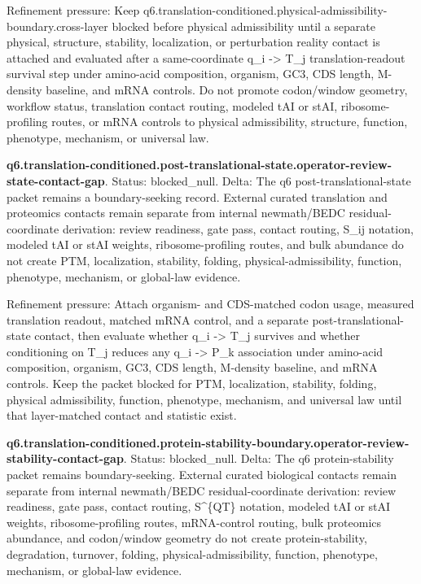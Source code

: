Refinement pressure: Keep q6.translation-conditioned.physical-admissibility-boundary.cross-layer blocked before physical admissibility until a separate physical, structure, stability, localization, or perturbation reality contact is attached and evaluated after a same-coordinate q\_i -> T\_j translation-readout survival step under amino-acid composition, organism, GC3, CDS length, M-density baseline, and mRNA controls. Do not promote codon/window geometry, workflow status, translation contact routing, modeled tAI or stAI, ribosome-profiling routes, or mRNA controls to physical admissibility, structure, function, phenotype, mechanism, or universal law.

\textbf{q6.translation-conditioned.post-translational-state.operator-review-state-contact-gap}. Status: blocked\_null. Delta: The q6 post-translational-state packet remains a boundary-seeking record. External curated translation and proteomics contacts remain separate from internal newmath/BEDC residual-coordinate derivation: review readiness, gate pass, contact routing, S\_ij notation, modeled tAI or stAI weights, ribosome-profiling routes, and bulk abundance do not create PTM, localization, stability, folding, physical-admissibility, function, phenotype, mechanism, or global-law evidence.

Refinement pressure: Attach organism- and CDS-matched codon usage, measured translation readout, matched mRNA control, and a separate post-translational-state contact, then evaluate whether q\_i -> T\_j survives and whether conditioning on T\_j reduces any q\_i -> P\_k association under amino-acid composition, organism, GC3, CDS length, M-density baseline, and mRNA controls. Keep the packet blocked for PTM, localization, stability, folding, physical admissibility, function, phenotype, mechanism, and universal law until that layer-matched contact and statistic exist.

\textbf{q6.translation-conditioned.protein-stability-boundary.operator-review-stability-contact-gap}. Status: blocked\_null. Delta: The q6 protein-stability packet remains boundary-seeking. External curated biological contacts remain separate from internal newmath/BEDC residual-coordinate derivation: review readiness, gate pass, contact routing, S\textasciicircum{}\{QT\} notation, modeled tAI or stAI weights, ribosome-profiling routes, mRNA-control routing, bulk proteomics abundance, and codon/window geometry do not create protein-stability, degradation, turnover, folding, physical-admissibility, function, phenotype, mechanism, or global-law evidence.

